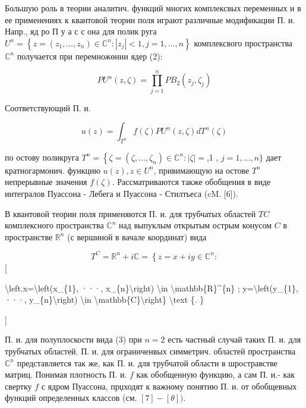 \documentclass[10pt]{article}
\begin{document}
Большую роль в теории аналитич. функций многих комплексвых переменных и в ее применениях к квантовой теории поля играют различные модификации П. и. Напр., яд ро П у а с с она для полик руга $U^{n}=\left\{z=\left(z_{1}, \ldots, z_{n}\right) \in \mathbb{C}^{n}:\left|z_{j}\right|<1, j=1, \ldots, n\right\}$ комплексвого пространства $\mathbb{C}^{n}$ получается при перемножөнии ядер (2):



\[

P U^{n}(z, \zeta)=\prod_{j=1}^{n} P B_{2}\left(z_{j}, \zeta_{j}\right)

\]



Соответствующий П. и.



\[

u(z)=\int_{T^{n}} f(\zeta) P U^{n}(z, \zeta) d T^{n}(\zeta)

\]



по остову поликруга $T^{n}=\left\{\zeta=\left(\zeta, \ldots, \zeta_{n}\right) \in \mathbb{C}^{n}:|\zeta|=\right.$,1 , $j=1, \ldots, n\}$ дает кратногармонич. функцию $u(z), z \in U^{n}$, привимающую на остове $T^{n}$ непрерывные значения $f(\zeta)$. Рассматриваются также обобщения в виде интегралов Пуассона - Лебега и Пуассона - Стилтьеса (cM. [6]).



В квантовой теории поля применяются П. и. для трубчатых областей $T C$ комплексного пространства $\mathbb{C}^{n}$ над выпуклым открытым острым конусом $C$ в пространстве $\mathbb{R}^{n}$ (с вершиной в вачале координат) вида



\[

T^{C}=\mathbb{R}^{n}+i \mathbb{C}=\left\{z=x+i y \in \mathbb{C}^{n}:\right.

\][



\textbackslash left.x=\textbackslash left(x\_\{1\}, ···, x\_\{n\}\textbackslash right) \textbackslash in \textbackslash mathbb\{R\}\^{}\{n\} ; y=\textbackslash left(y\_\{1\}, ···, y\_\{n\}\textbackslash right) \textbackslash in \textbackslash mathbb\{C\}\textbackslash right\} \textbackslash text \{. \}

]



П. и. для полуплоскости вида (3) при $n=2$ есть частный случай таких П. и. для трубчатых областей. П. и. для ограниченвых симметрич. областей пространства $\mathbb{C}^{n}$ представляется так же, как П. и. для трубчатой области в шростравстве матриц. Понимая плотность П. и. $f$ как обобщенную функцию, а сам П. и.- как свертку $f$ с ядром Пуассона, прџходят к важному понятию П. и. от обобщевных функций определенных классов (см. $[7]-[\theta])$.
\end{document}
